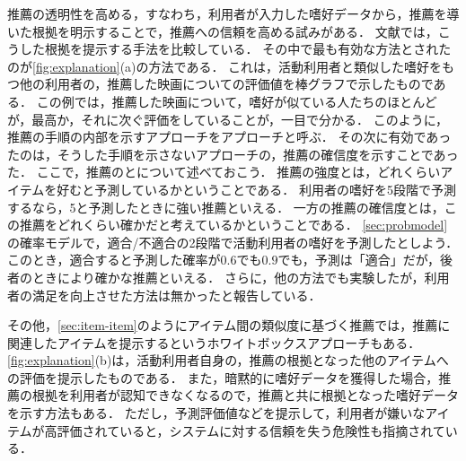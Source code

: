 推薦の透明性を高める，すなわち，利用者が入力した嗜好データから，推薦を導いた根拠を明示することで，推薦への信頼を高める試みがある．
文献\cite{cscw:00:01}では，こうした根拠を提示する手法を比較している．
その中で最も有効な方法とされたのが\ref{fig:explanation}(a)の方法である．
これは，活動利用者と類似した嗜好をもつ他の利用者の，推薦した映画についての評価値を棒グラフで示したものである．
この例では，推薦した映画について，嗜好が似ている人たちのほとんどが，最高か，それに次ぐ評価をしていることが，一目で分かる．
このように，推薦の手順の内部を示すアプローチをアプローチと呼ぶ．
その次に有効であったのは，そうした手順を示さないアプローチの，推薦の確信度を示すことであった．
ここで，推薦のとについて述べておこう．
推薦の強度とは，どれくらいアイテムを好むと予測しているかということである．
利用者の嗜好を5段階で予測するなら，5と予測したときに強い推薦といえる．
一方の推薦の確信度とは，この推薦をどれくらい確かだと考えているかということである．
\ref{sec:probmodel}の確率モデルで，適合/不適合の2段階で活動利用者の嗜好を予測したとしよう．
このとき，適合すると予測した確率が$0.6$でも$0.9$でも，予測は「適合」だが，後者のときにより確かな推薦といえる．
さらに，他の方法でも実験したが，利用者の満足を向上させた方法は無かったと報告している．

その他，\ref{sec:item-item}のようにアイテム間の類似度に基づく推薦では，推薦に関連したアイテムを提示するというホワイトボックスアプローチもある．
\ref{fig:explanation}(b)は，活動利用者自身の，推薦の根拠となった他のアイテムへの評価を提示したものである．
また，暗黙的に嗜好データを獲得した場合，推薦の根拠を利用者が認知できなくなるので，推薦と共に根拠となった嗜好データを示す方法もある．
ただし，予測評価値などを提示して，利用者が嫌いなアイテムが高評価されていると，システムに対する信頼を失う危険性も指摘されている\cite{sigir:01:01}．
